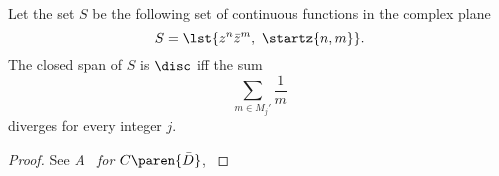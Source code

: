 % 

\begin{theorem}

Let the set $S$ be the following set of continuous functions in the complex plane 
%
\begin{equation*}
	S=\lst{z^{n}\bar{z}^{m},\ \startz{n,m} }.
\end{equation*}
%
The closed span of $S$ is $\disc$ iff the sum
%
\begin{equation*}
	\sum_{m\in M_{j}'}\frac{1}{m}
\end{equation*}
%
diverges for every integer $j$.
%
\label{thm:trent}
\end{theorem}

\begin{proof}
See \emph{A \mst\ for $C\paren{\bar{D}}$}, \cite[p. 296]{trent1981muntz}
\end{proof}


\endinput %